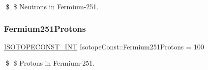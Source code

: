 \$ \$ Neutrons in Fermium-\/251. \mbox{\label{group___isotope_const-_fermium-_fm251_gaf4b6c2db155ca7fa771e55da220259e6}} 
\subsubsection{\texorpdfstring{Fermium251\+Protons}{Fermium251Protons}}
{\footnotesize\ttfamily \mbox{\hyperlink{group___isotope_const-_macros_ga5f18360b3e99483a35c32d789e62621c}{I\+S\+O\+T\+O\+P\+E\+C\+O\+N\+S\+T\+\_\+\+I\+NT}} Isotope\+Const\+::\+Fermium251\+Protons = 100}

\$ \$ Protons in Fermium-\/251. 